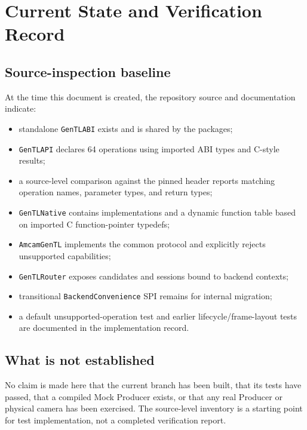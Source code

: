 \documentclass[11pt,a4paper]{report}
\begin{document}
\chapter{Current State and Verification Record}

\section{Source-inspection baseline}
At the time this document is created, the repository source and documentation indicate:
\begin{itemize}
  \item standalone \texttt{GenTLABI} exists and is shared by the packages;
  \item \texttt{GenTLAPI} declares 64 operations using imported ABI types and C-style results;
  \item a source-level comparison against the pinned header reports matching operation names, parameter types, and return types;
  \item \texttt{GenTLNative} contains implementations and a dynamic function table based on imported C function-pointer typedefs;
  \item \texttt{AmcamGenTL} implements the common protocol and explicitly rejects unsupported capabilities;
  \item \texttt{GenTLRouter} exposes candidates and sessions bound to backend contexts;
  \item transitional \texttt{BackendConvenience} SPI remains for internal migration;
  \item a default unsupported-operation test and earlier lifecycle/frame-layout tests are documented in the implementation record.
\end{itemize}

\section{What is not established}
No claim is made here that the current branch has been built, that its tests have passed, that a compiled Mock Producer exists, or that any real Producer or physical camera has been exercised. The source-level inventory is a starting point for test implementation, not a completed verification report.
\end{document}
